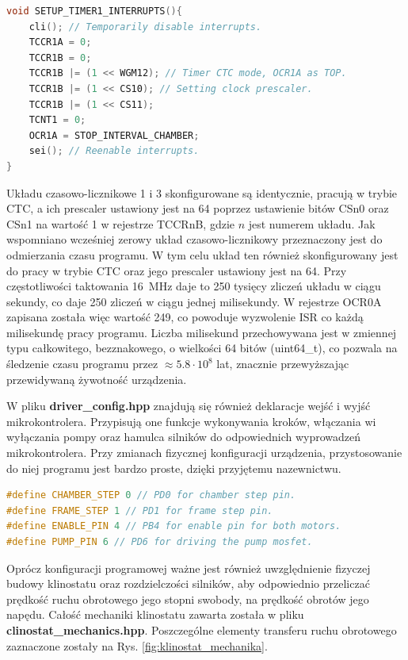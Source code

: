 \begin{lstlisting}[language=C++, caption=Przykładowa konfiguracja pierwszego układu czasowo-licznikowego.]
void SETUP_TIMER1_INTERRUPTS(){
	cli(); // Temporarily disable interrupts.
	TCCR1A = 0;
	TCCR1B = 0;
	TCCR1B |= (1 << WGM12); // Timer CTC mode, OCR1A as TOP.
	TCCR1B |= (1 << CS10); // Setting clock prescaler.
	TCCR1B |= (1 << CS11);
	TCNT1 = 0;
	OCR1A = STOP_INTERVAL_CHAMBER;
	sei(); // Reenable interrupts.
}
\end{lstlisting}
Układu czasowo-licznikowe 1 i 3 skonfigurowane są identycznie, pracują w trybie CTC, a ich prescaler ustawiony jest na 64 poprzez ustawienie bitów CSn0 oraz CSn1 na wartość 1 w rejestrze TCCRnB, gdzie $n$ jest numerem układu.  Jak wspomniano wcześniej zerowy układ czasowo-licznikowy przeznaczony jest do odmierzania czasu programu. W tym celu układ ten również skonfigurowany jest do pracy w trybie CTC oraz jego prescaler ustawiony jest na 64. Przy częstotliwości taktowania \SI{16}{MHz} daje to 250 tysięcy zliczeń układu w ciągu sekundy, co daje 250 zliczeń w ciągu jednej milisekundy. W rejestrze OCR0A zapisana została więc wartość 249, co powoduje wyzwolenie ISR co każdą milisekundę pracy programu. Liczba milisekund przechowywana jest w zmiennej typu całkowitego, bezznakowego, o wielkości 64 bitów (uint64\_t), co pozwala na śledzenie czasu programu przez $\approx5.8\cdot 10^8$ lat, znacznie przewyższając przewidywaną żywotność urządzenia.

W pliku \textbf{driver\_config.hpp} znajdują się również deklaracje wejść i wyjść mikrokontrolera. Przypisują one funkcje wykonywania kroków, włączania wi wyłączania pompy oraz hamulca silników do odpowiednich wyprowadzeń mikrokontrolera. Przy zmianach fizycznej konfiguracji urządzenia, przystosowanie do niej programu jest bardzo proste, dzięki przyjętemu nazewnictwu.

\begin{lstlisting}[language=C++, caption=Konfiguracja wyprowadzeń.]
#define CHAMBER_STEP 0 // PD0 for chamber step pin.
#define FRAME_STEP 1 // PD1 for frame step pin.
#define ENABLE_PIN 4 // PB4 for enable pin for both motors.
#define PUMP_PIN 6 // PD6 for driving the pump mosfet.
\end{lstlisting}

Oprócz konfiguracji programowej ważne jest również uwzględnienie fizyczej budowy klinostatu oraz rozdzielczości silników, aby odpowiednio przeliczać prędkość ruchu obrotowego jego stopni swobody, na prędkość obrotów jego napędu. Całość mechaniki klinostatu zawarta została w pliku \textbf{clinostat\_mechanics.hpp}. Poszczególne elementy transferu ruchu obrotowego zaznaczone zostały na Rys. \ref{fig:klinostat_mechanika}.


